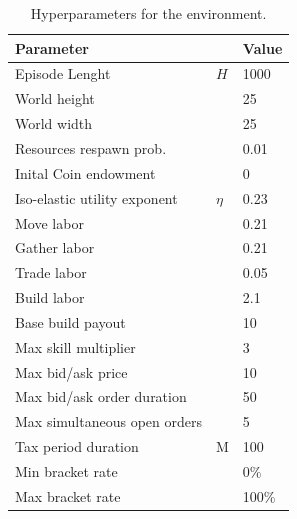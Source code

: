 


\begin{table}[]
    \centering
    \begin{tabular}{lll}
    \hline
    Parameter                    &  & Value \\ \hline
    Episode Lenght               & \( H \) & 1000  \\
    World height                 &  & 25    \\
    World width                  &  & 25    \\
    Resources respawn prob.      &  & 0.01  \\
    Inital Coin endowment        &  & 0     \\
    Iso-elastic utility exponent &  \(\eta\)& 0.23  \\
    Move labor                   &  & 0.21  \\
    Gather labor                 &  & 0.21  \\
    Trade labor                  &  & 0.05  \\
    Build labor                  &  & 2.1   \\
    Base build payout            &  & 10    \\
    Max skill multiplier         &  & 3     \\
    Max bid/ask price            &  & 10    \\
    Max bid/ask order duration   &  & 50    \\
    Max simultaneous open orders &  & 5     \\
    Tax period duration          & M & 100   \\
    Min bracket rate             &  & 0\%   \\
    Max bracket rate             &  & 100\% \\ \hline
    \end{tabular}
    \caption{\label{tab:hyperparameter_env}Hyperparameters for the environment.}
\end{table}

